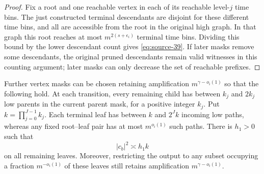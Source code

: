 \begin{proof}
Fix a root and one reachable vertex in each of its reachable
level-\(j\) time bins. The just constructed terminal descendants
are disjoint for these different time bins, and all are
accessible from the root in the original high graph. In that graph
this root reaches at most \(m^{2(s+\epsilon_i)}\) terminal time bins.
Dividing this bound by the lower descendant count gives
\eqref{eq:source-39}. If later masks remove some descendants,
the original pruned descendants remain valid witnesses in
this counting argument; later masks can only decrease the set
of reachable prefixes.
\end{proof}

\begin{lemma}\label{ext:leaves}
Further vertex masks can be chosen retaining amplification
\(m^{\gamma-o_i(1)}\) so that the following hold.
At each transition, every remaining child has between \(k_j\)
and \(2k_j\) low parents in the current parent mask, for a
positive integer \(k_j\). Put \(k=\prod_{j=0}^{J-1}k_j\).
Each terminal leaf has between \(k\) and \(2^Jk\) incoming low
paths, whereas any fixed root--leaf pair has at most
\(m^{o_i(1)}\) such paths. There is \(h_1>0\) such that
\[
                             |c_b|^2\asymp h_1k
\]
on all remaining leaves. Moreover, restricting the output to
any subset occupying a fraction \(m^{-o_i(1)}\) of these leaves
still retains amplification \(m^{\gamma-o_i(1)}\).
\end{lemma}

